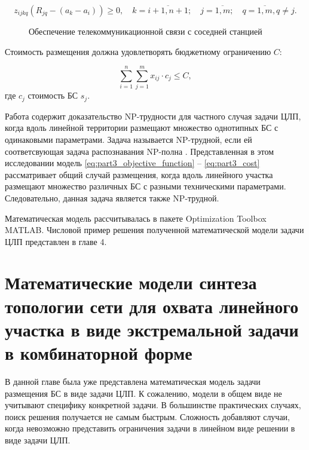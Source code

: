 \begin{equation}
  \label{eq:part3_z_ijkq_4}
  z_{ijkq} (R_{jq}-(a_k-a_i )) \geq 0, \quad k=\overline{i+1,n+1}; \quad j=\overline{1,m}; \quad q= \overline{1,m}, q \neq j.
\end{equation}

\begin{figure}[ht]
  \caption{Обеспечение телекоммуникационной связи с соседней станцией}\label{fig:part3_station_link_between_points}
\end{figure}

Стоимость размещения должна удовлетворять бюджетному ограничению $C$:

\begin{equation}
  \label{eq:part3_cost}
  \sum\limits_{i=1}^n \sum\limits_{j=1}^m x_{ij} \cdot c_j \leq C,
\end{equation}
где $c_j$ стоимость БС $s_j$.

Работа \cite{Ivanov2018} содержит доказательство NP-трудности для частного случая задачи ЦЛП, когда вдоль линейной территории размещают множество однотипных БС с одинаковыми параметрами. Задача называется NP-трудной, если ей соответсвующая задача распознавания NP-полна \cite{Pershin2013}.  Представленная в этом исследовании модель \cref{eq:part3_objective_function} -- \cref{eq:part3_cost} рассматривает общий случай размещения, когда вдоль линейного участка размещают множество различных БС с разными техническими параметрами. Следовательно, данная задача является также NP-трудной.

Математическая модель рассчитывалась в пакете Optimization Toolbox MATLAB. Числовой пример решения полученной математической модели задачи ЦЛП представлен в главе 4.


\section{Математические модели синтеза топологии сети для охвата линейного участка в виде экстремальной задачи в комбинаторной форме}

В данной главе была уже представлена математическая модель задачи размещения БС в виде задачи ЦЛП. К сожалению, модели в общем виде не учитывают специфику конкретной задачи. В большинстве практических случаях, поиск решения получается не самым быстрым. Сложность добавляют случаи, когда невозможно представить ограничения задачи в линейном виде решении в виде задачи ЦЛП. 


